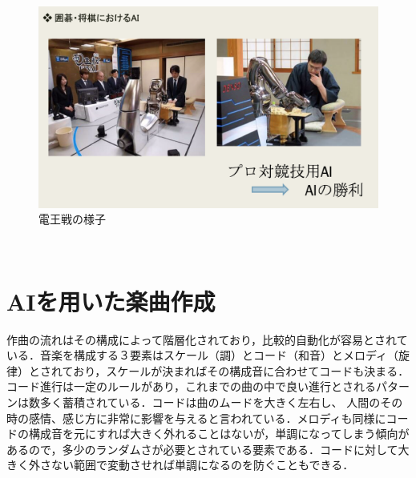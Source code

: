 \newpage
\begin{figure}[!ht]
    \begin{screen}
    \begin{center}
        \includegraphics[scale=0.7, clip]{./img/igo1.png}
        \caption{電王戦の様子}
        \label{fig:電王戦の様子}
    \end{center}
\end{screen}
\end{figure}\\
\newpage
\section{AIを用いた楽曲作成}
作曲の流れはその構成によって階層化されており，比較的自動化が容易とされている．音楽を構成する３要素はスケール（調）とコード（和音）とメロディ（旋律）とされており，スケールが決まればその構成音に合わせてコードも決まる．コード進行は一定のルールがあり，これまでの曲の中で良い進行とされるパターンは数多く蓄積されている．コードは曲のムードを大きく左右し、
人間のその時の感情、感じ方に非常に影響を与えると言われている．メロディも同様にコードの構成音を元にすれば大きく外れることはないが，単調になってしまう傾向があるので，多少のランダムさが必要とされている要素である．コードに対して大きく外さない範囲で変動させれば単調になるのを防ぐこともできる．

